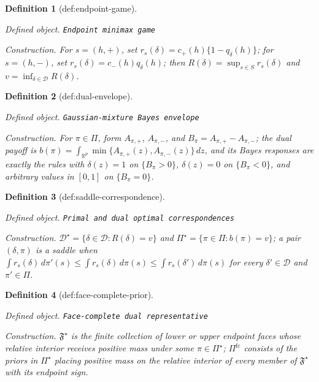 \documentclass{article}
\newtheorem{definition}{Definition}
\begin{document}
\begin{definition}[def:endpoint-game]\label{def:endpoint-game}
\par\smallskip\noindent\emph{Defined object.} \texttt{Endpoint minimax game}
\par\smallskip\noindent\emph{Construction.} For \(s=(h,+)\), set \(r_s(\delta)=c_+(h)\{1-q_{\delta}(h)\}\); for \(s=(h,-)\), set \(r_s(\delta)=c_-(h)q_{\delta}(h)\); then \(R(\delta)=\sup_{s\in S}r_s(\delta)\) and \(v=\inf_{\delta\in\mathcal D}R(\delta)\).
\end{definition}

\begin{definition}[def:dual-envelope]\label{def:dual-envelope}
\par\smallskip\noindent\emph{Defined object.} \texttt{Gaussian-\allowbreak{}mixture Bayes envelope}
\par\smallskip\noindent\emph{Construction.} For \(\pi\in\Pi\), form \(A_{\pi,+}\), \(A_{\pi,-}\), and \(B_{\pi}=A_{\pi,+}-A_{\pi,-}\); the dual payoff is \(b(\pi)=\int_{\mathbb R^p}\min\{A_{\pi,+}(z),A_{\pi,-}(z)\}\,dz\), and its Bayes responses are exactly the rules with \(\delta(z)=1\) on \(\{B_{\pi}>0\}\), \(\delta(z)=0\) on \(\{B_{\pi}<0\}\), and arbitrary values in \([0,1]\) on \(\{B_{\pi}=0\}\).
\end{definition}

\begin{definition}[def:saddle-correspondence]\label{def:saddle-correspondence}
\par\smallskip\noindent\emph{Defined object.} \texttt{Primal and dual optimal correspondences}
\par\smallskip\noindent\emph{Construction.} \(\mathcal D^{\star}=\{\delta\in\mathcal D:R(\delta)=v\}\) and \(\Pi^{\star}=\{\pi\in\Pi:b(\pi)=v\}\); a pair \((\delta,\pi)\) is a saddle when \(\int r_s(\delta)\,d\pi'(s)\le\int r_s(\delta)\,d\pi(s)\le\int r_s(\delta')\,d\pi(s)\) for every \(\delta'\in\mathcal D\) and \(\pi'\in\Pi\).
\end{definition}

\begin{definition}[def:face-complete-prior]\label{def:face-complete-prior}
\par\smallskip\noindent\emph{Defined object.} \texttt{Face-\allowbreak{}complete dual representative}
\par\smallskip\noindent\emph{Construction.} \(\mathfrak F^{\star}\) is the finite collection of lower or upper endpoint faces whose relative interior receives positive mass under some \(\pi\in\Pi^{\star}\); \(\Pi^{\mathrm{fc}}\) consists of the priors in \(\Pi^{\star}\) placing positive mass on the relative interior of every member of \(\mathfrak F^{\star}\) with its endpoint sign.
\end{definition}
\end{document}
